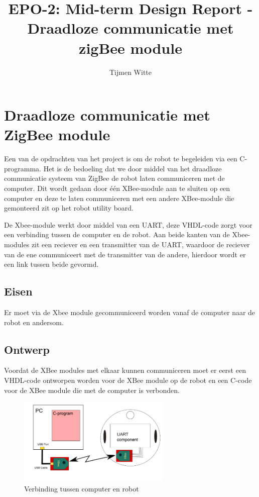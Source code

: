 \documentclass{report}
\title{EPO-2: Mid-term Design Report - Draadloze communicatie met zigBee module}
\author{Tijmen Witte}
\begin{document}
\chapter{Draadloze communicatie met ZigBee module}
\label{ch: draadloze communicatie met ZigBee module}

Een van de opdrachten van het project is om de robot te begeleiden via een C-programma.
Het is de bedoeling dat we door middel van het draadloze communicatie systeem van ZigBee de robot laten communiceren met de computer.
Dit wordt gedaan door één XBee-module aan te sluiten op een computer en deze te laten communiceren met een andere XBee-module die gemonteerd zit op het robot utility board.

De Xbee-module werkt door middel van een UART, deze VHDL-code zorgt voor een verbinding tussen de computer en de robot. Aan beide kanten van de Xbee-modules zit een reciever en een transmitter van de UART, waardoor de reciever van de ene communiceert met de transmitter van de andere, hierdoor wordt er een link tussen beide gevormd.


\section{Eisen}

Er moet via de Xbee module gecommuniceerd worden vanaf de computer naar de robot en andersom.


\section{Ontwerp}
Voordat de XBee modules met elkaar kunnen communiceren moet er eerst een VHDL-code ontworpen worden voor de XBee module op de robot en een C-code voor de XBee module die met de computer is verbonden.


\begin{figure}[H]
	\centering
	\includegraphics[width=0.65\textwidth]{zigbee.png}
	\caption{Verbinding tussen computer en robot}
	\label{fig:zigbee}
\end{figure}
\end{document}
